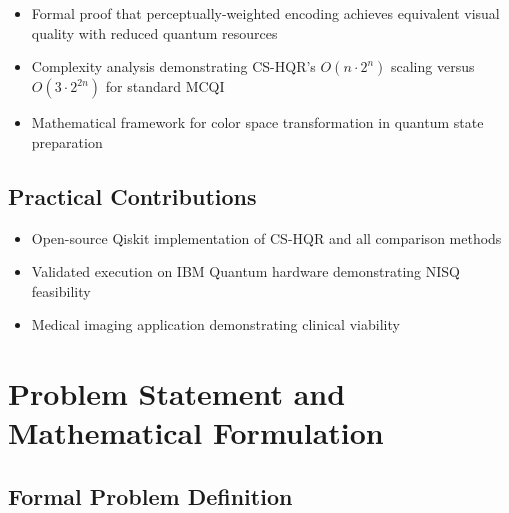 \documentclass[11pt,a4paper]{article}
\begin{document}
\begin{itemize}
    \item Formal proof that perceptually-weighted encoding achieves equivalent visual quality with reduced quantum resources
    \item Complexity analysis demonstrating CS-HQR's $O(n \cdot 2^n)$ scaling versus $O(3 \cdot 2^{2n})$ for standard MCQI
    \item Mathematical framework for color space transformation in quantum state preparation
\end{itemize}

\subsection{Practical Contributions}

\begin{itemize}
    \item Open-source Qiskit implementation of CS-HQR and all comparison methods
    \item Validated execution on IBM Quantum hardware demonstrating NISQ feasibility
    \item Medical imaging application demonstrating clinical viability
\end{itemize}

\section{Problem Statement and Mathematical Formulation}
\label{sec:problem_statement}

\subsection{Formal Problem Definition}
\label{subsec:formal_problem}
\end{document}
